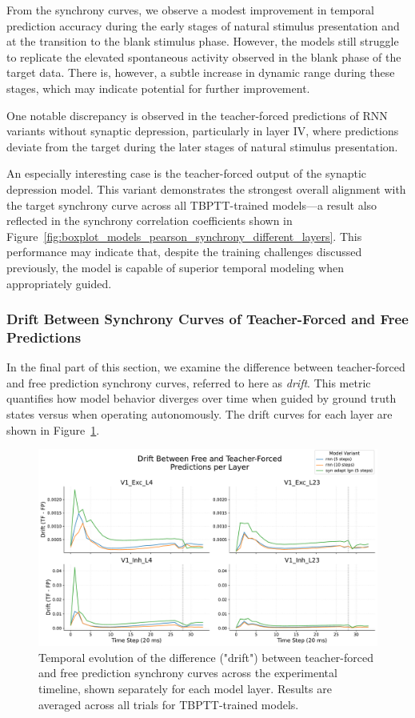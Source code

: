 From the synchrony curves, we observe a modest improvement in temporal prediction accuracy during the early stages of natural stimulus presentation and at the transition to the blank stimulus phase. However, the models still struggle to replicate the elevated spontaneous activity observed in the blank phase of the target data. There is, however, a subtle increase in dynamic range during these stages, which may indicate potential for further improvement.

One notable discrepancy is observed in the teacher-forced predictions of RNN variants without synaptic depression, particularly in layer IV, where predictions deviate from the target during the later stages of natural stimulus presentation. 

An especially interesting case is the teacher-forced output of the synaptic depression model. This variant demonstrates the strongest overall alignment with the target synchrony curve across all TBPTT-trained models—a result also reflected in the synchrony correlation coefficients shown in Figure~\ref{fig:boxplot_models_pearson_synchrony_different_layers}. This performance may indicate that, despite the training challenges discussed previously, the model is capable of superior temporal modeling when appropriately guided.

\subsubsection{Drift Between Synchrony Curves of Teacher-Forced and Free Predictions}
\label{subsubsec:drift_teacher_free_synchrony}

In the final part of this section, we examine the difference between teacher-forced and free prediction synchrony curves, referred to here as \emph{drift}. This metric quantifies how model behavior diverges over time when guided by ground truth states versus when operating autonomously. The drift curves for each layer are shown in Figure~\ref{fig:teacher_forced_free_drift}.

\begin{figure}
    \centering
    \includegraphics[width=\linewidth]{img/plots/temporal_drift_forced_free.pdf}
    \caption{Temporal evolution of the difference ("drift") between teacher-forced and free prediction synchrony curves across the experimental timeline, shown separately for each model layer. Results are averaged across all trials for TBPTT-trained models.}
    \label{fig:teacher_forced_free_drift}
\end{figure}

